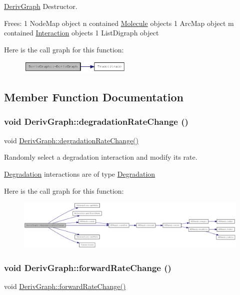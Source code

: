 \hyperlink{classDerivGraph}{DerivGraph} Destructor.

Frees: 1 NodeMap object n contained \hyperlink{classMolecule}{Molecule} objects 1 ArcMap object m contained \hyperlink{classInteraction}{Interaction} objects 1 ListDigraph object 

Here is the call graph for this function:\nopagebreak
\begin{figure}[H]
\begin{center}
\leavevmode
\includegraphics[width=153pt]{classDerivGraph_a27b4fed56f8d2a745582622b7cb78b50_cgraph}
\end{center}
\end{figure}


\subsection{Member Function Documentation}
\hypertarget{classDerivGraph_a038841806aa1fe80a9450f977baa1fd2}{
\subsubsection[{degradationRateChange}]{\setlength{\rightskip}{0pt plus 5cm}void DerivGraph::degradationRateChange ()}}
\label{classDerivGraph_a038841806aa1fe80a9450f977baa1fd2}
void \hyperlink{classDerivGraph_a038841806aa1fe80a9450f977baa1fd2}{DerivGraph::degradationRateChange()}

Randomly select a degradation interaction and modify its rate.

\hyperlink{classDegradation}{Degradation} interactions are of type \hyperlink{classDegradation}{Degradation} 

Here is the call graph for this function:\nopagebreak
\begin{figure}[H]
\begin{center}
\leavevmode
\includegraphics[width=420pt]{classDerivGraph_a038841806aa1fe80a9450f977baa1fd2_cgraph}
\end{center}
\end{figure}
\hypertarget{classDerivGraph_afbda567a3f51d05fad37eb46fc121a89}{
\subsubsection[{forwardRateChange}]{\setlength{\rightskip}{0pt plus 5cm}void DerivGraph::forwardRateChange ()}}
\label{classDerivGraph_afbda567a3f51d05fad37eb46fc121a89}
void \hyperlink{classDerivGraph_afbda567a3f51d05fad37eb46fc121a89}{DerivGraph::forwardRateChange()}


